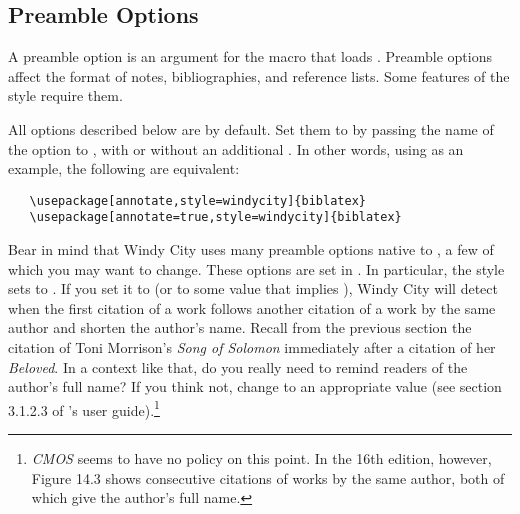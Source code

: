 \documentclass[11pt,letterpaper,oneside]{article}
\begin{document}
\subsection{Preamble Options}
\label{preamble}

A preamble option is an argument for the  macro that
loads \biblatex. Preamble options affect the format of notes,
bibliographies, and reference lists. Some features of the style
require them.

All options described below are  by default. Set them to
 by passing the name of the option to \biblatex, with or
without an additional . In other words, using
 as an example, the following are equivalent:

\begin{verbatim}
   \usepackage[annotate,style=windycity]{biblatex}
   \usepackage[annotate=true,style=windycity]{biblatex}
\end{verbatim}

Bear in mind that Windy City uses many preamble options native to
\biblatex, a few of which you may want to change. These options are
set in . In particular, the style sets
 to . If you set it to  (or to
some value that implies ), Windy City will detect when the
first citation of a work follows another citation of a work by the
same author and shorten the author's name. Recall from the previous
section the citation of Toni Morrison's \textit{Song of Solomon}
immediately after a citation of her \textit{Beloved}. In a context
like that, do you really need to remind readers of the author's full
name? If you think not, change  to an appropriate
value (see section 3.1.2.3 of \biblatex's user
guide).\footnote{\textit{CMOS} seems to have no policy on this point.
In the 16th edition, however, Figure 14.3 shows consecutive citations
of works by the same author, both of which give the author's full
name.}
\end{document}
